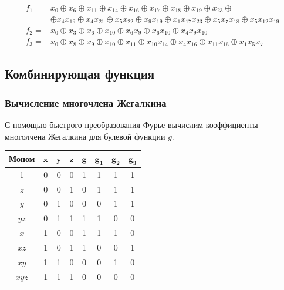 \documentclass[a4paper,12pt]{article}
\theoremstyle{definition}
\begin{document}
	\begin{align*}
		f_1 =& x_0 \oplus x_6 \oplus x_{11} \oplus x_{14} \oplus x_{16} \oplus x_{17} \oplus x_{18} \oplus x_{19} \oplus x_{23} \oplus\\
			 &\oplus x_{4} x_{19} \oplus x_{4} x_{21} \oplus x_5 x_{22} \oplus x_9 x_{19} \oplus x_1 x_{17} x_23 \oplus x_5 x_7 x_{18} \oplus x_5 x_{12} x_{19} \\[2ex]
		f_2 =& x_0 \oplus x_3 \oplus x_6 \oplus x_{10} \oplus x_6 x_9 \oplus x_6 x_{10} \oplus x_4 x_9 x_{10} \\[2ex]
		f_3 =& x_0 \oplus x_8 \oplus x_9 \oplus x_{10} \oplus x_{11} \oplus x_{10} x_{14} \oplus x_4 x_{16}\oplus x_{11} x_{16} \oplus x_1 x_5 x_7 
	\end{align*}
	
	\subsection{Комбинирующая функция}
	
	\subsubsection{Вычисление многочлена Жегалкина}
	
	С помощью быстрого преобразования Фурье вычислим коэффициенты многолчена Жегалкина для булевой функции $g$.
	
	\begin{table}[h!]
		\begin{center}
			\begin{tabular}{|c|c|c|c||c||c|c|c|}
				\hline
				\textbf{Моном} & $ \pmb{x} $ & $ \pmb{y} $ & $ \pmb{z} $ & $ \pmb{g} $ & $ \pmb{g_1} $ & $ \pmb{g_2} $ & $ \pmb{g_3} $ \\ \hline
				1 & 0 & 0 & 0 & 1 & 1 & 1 & 1 \\ \hline
			  $z$ & 0 & 0 & 1 & 0 & 1 & 1 & 1 \\ \hline
			  $y$ & 0 & 1 & 0 & 0 & 0 & 1 & 1 \\ \hline
			$y z$ & 0 & 1 & 1 & 1 & 1 & 0 & 0 \\ \hline
			  $x$ & 1 & 0 & 0 & 1 & 1 & 1 & 0 \\ \hline
			$x z$ & 1 & 0 & 1 & 1 & 0 & 0 & 1 \\ \hline
			$x y$ & 1 & 1 & 0 & 0 & 0 & 1 & 0 \\ \hline
		  $x y z$ & 1 & 1 & 1 & 0 & 0 & 0 & 0 \\ \hline
			\end{tabular}
		\end{center}
	\end{table}
		
\end{document}
